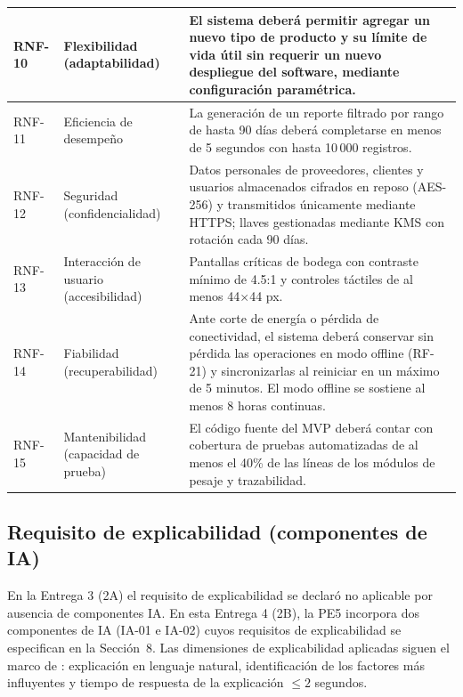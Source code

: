 \documentclass[11pt,a4paper]{article}
\begin{document}
\begin{longtable}{|p{1.4cm}|p{3cm}|p{9.5cm}|}
\hline
RNF-10 & Flexibilidad (adaptabilidad) & El sistema deberá permitir agregar un nuevo tipo de producto y su límite de vida útil sin requerir un nuevo despliegue del software, mediante configuración paramétrica. \\
\hline
RNF-11 & Eficiencia de desempeño & La generación de un reporte filtrado por rango de hasta 90 días deberá completarse en menos de 5 segundos con hasta 10\,000 registros. \\
\hline
RNF-12 & Seguridad (confidencialidad) & Datos personales de proveedores, clientes y usuarios almacenados cifrados en reposo (AES-256) y transmitidos únicamente mediante HTTPS; llaves gestionadas mediante KMS con rotación cada 90 días. \\
\hline
RNF-13 & Interacción de usuario (accesibilidad) & Pantallas críticas de bodega con contraste mínimo de 4.5:1 y controles táctiles de al menos 44$\times$44 px. \\
\hline
RNF-14 & Fiabilidad (recuperabilidad) & Ante corte de energía o pérdida de conectividad, el sistema deberá conservar sin pérdida las operaciones en modo offline (RF-21) y sincronizarlas al reiniciar en un máximo de 5 minutos. El modo offline se sostiene al menos 8 horas continuas. \\
\hline
RNF-15 & Mantenibilidad (capacidad de prueba) & El código fuente del MVP deberá contar con cobertura de pruebas automatizadas de al menos el 40\% de las líneas de los módulos de pesaje y trazabilidad. \\
\hline
\end{longtable}

\subsection{Requisito de explicabilidad (componentes de IA)}

En la Entrega 3 (2A) el requisito de explicabilidad se declaró no aplicable por ausencia de componentes IA. En esta Entrega 4 (2B), la PE5 incorpora dos componentes de IA (IA-01 e IA-02) cuyos requisitos de explicabilidad se especifican en la Sección~8. Las dimensiones de explicabilidad aplicadas siguen el marco de \cite{chazette2022explainable}: explicación en lenguaje natural, identificación de los factores más influyentes y tiempo de respuesta de la explicación $\leq 2$ segundos.

\end{document}
